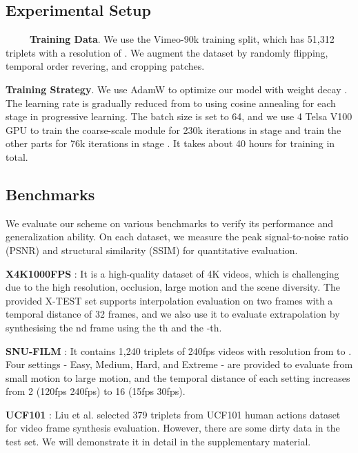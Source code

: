 \documentclass[sigconf]{acmart}
\begin{document}
\subsection{Experimental Setup}
\label{sec:4-1}

\ \ \ \ \ \textbf{Training Data}. We use the Vimeo-90k \cite{xue2019video} training split, which has 51,312 triplets with a resolution of . We augment the dataset by randomly flipping, temporal order revering, and cropping  patches.

\textbf{Training Strategy}. We use AdamW \cite{loshchilov2018fixing} to optimize our model with weight decay . The learning rate is gradually reduced from  to  using cosine annealing for each stage in progressive learning. The batch size is set to 64, and we use 4 Telsa V100 GPU to train the coarse-scale module for 230k iterations in stage \uppercase\expandafter{} and train the other parts for 76k iterations in stage \uppercase\expandafter{}. It takes about 40 hours for training in total.

\subsection{Benchmarks}
\label{sec:4-2}

We evaluate our scheme on various benchmarks to verify its performance and generalization ability. On each dataset, we measure the peak signal-to-noise ratio (PSNR) and structural similarity (SSIM) for quantitative evaluation.

\textbf{X4K1000FPS} \cite{sim2021xvfi}: It is a high-quality dataset of 4K videos, which is challenging due to the high resolution, occlusion, large motion and the scene diversity. The provided X-TEST set supports  interpolation evaluation on two frames with a temporal distance of 32 frames, and we also use it to evaluate  extrapolation by synthesising the nd frame using the th and the -th. 

\textbf{SNU-FILM} \cite{choi2020channel}: It contains 1,240 triplets of 240fps videos with resolution from  to . Four settings - Easy, Medium, Hard, and Extreme - are provided to evaluate from small motion to large motion, and the temporal distance of each setting increases from 2 (120fps  240fps) to 16 (15fps  30fps). 

\textbf{UCF101} \cite{soomro2012ucf101}: Liu et al. \cite{liu2017video} selected 379 triplets from UCF101 human actions dataset for video frame synthesis evaluation. However, there are some dirty data in the test set. We will demonstrate it in detail in the supplementary material.
\end{document}
